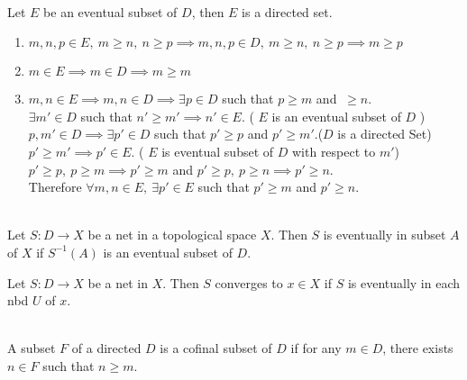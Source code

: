 \begin{remark}\cite[10.1.6]{joshi}\\
	Let $E$ be an eventual subset of $D$, then $E$ is a directed set.
	\begin{enumerate}
		\item $m,n,p \in E,\ m \ge n,\ n \ge p \implies m,n,p \in D,\ m \ge n,\ n \ge p \implies m \ge p$
		\item $m \in E \implies m \in D \implies m \ge m$
		\item $m,n \in E \implies m,n \in D \implies \exists p \in D$ such that $p \ge m$ and $\ \ge n$.\\

			$\exists m' \in D$ such that $n' \ge m' \implies n' \in E$. ( $E$ is an eventual subset of $D$ )\\

			$p,m' \in D \implies \exists p' \in D$ such that $p' \ge p$ and $p' \ge m'$.($D$ is a directed Set)\\

			$p' \ge m' \implies p' \in E$. ( $E$ is eventual subset of $D$ with respect to $m'$)\\

			$p' \ge p,\ p \ge m \implies p' \ge m$ and $p' \ge p,\ p \ge n \implies p' \ge n$.\\

			Therefore $\forall m,n \in E,\ \exists p' \in E$ such that $p' \ge m$ and $p' \ge n$.
	\end{enumerate}
\end{remark}

\begin{definition}\cite[10.1.5]{joshi}\\
	Let $S : D \to X$ be a net in a topological space $X$. Then $S$ is eventually in subset $A$ of $X$ if $S^{-1}(A)$ is an eventual subset of $D$.
\end{definition}

\begin{remark}
	Let $S : D \to X$ be a net in $X$. Then $S$ converges to $x \in X$ if $S$ is eventually in each nbd $U$ of $x$.
\end{remark}

\begin{definition}\cite[10.1.7]{joshi}\\
	A subset $F$ of a directed $D$ is a cofinal subset of $D$ if for any $m \in D$, there exists $n \in F$ such that $n \ge m$.
\end{definition}

